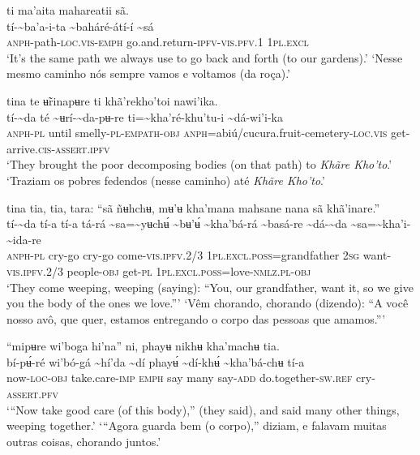 \documentclass[output=paper,
modfonts,nonflat
]{langsci/langscibook}
\begin{document}
\ea ti ma'aita mahareatii sã.  \\[.3em]
\gll tí-{\textasciitilde}ba'a-i-ta	{\textasciitilde}baháré-átí-í	{\textasciitilde}sá \\
     \textsc{anph}-path\textsc{-loc.vis-emph}	go.and.return-\textsc{ipfv-vis.pfv.}1	1\textsc{pl.excl}\\
\glt ‘It's the same path we always use to go back and forth (to our gardens).’
\glt ‘Nesse mesmo caminho nós sempre vamos e voltamos (da roça).’
\z 

\ea tina te ʉ̃rinapʉre ti khã'rekho'toi nawi'ika. \\[.3em]
\gll tí-{\textasciitilde}da	té	{\textasciitilde}ʉrí-{\textasciitilde}da-pʉ-re	ti={\textasciitilde}kha'ré-khu'tu-i	{\textasciitilde}dá-wi'i-ka \\
     \textsc{anph-pl}	until	smelly\textsc{-pl-empath-obj}	\textsc{anph}=abiú/cucura.fruit-cemetery\textsc{-loc.vis}	get-arrive\textsc{.cis-assert.ipfv}\\
\glt ‘They brought the poor decomposing bodies (on that path) to \textit{Khãre Kho’to}.’
\glt ‘Traziam os pobres fedendos (nesse caminho) até \textit{Khãre Kho’to}.’
\z 

\ea tina tia, tia, tara: “sã ñʉhchʉ, mʉ'ʉ kha'mana mahsane nana sã khã'inare.” \\[.3em]
\gll tí-{\textasciitilde}da	tí-a	tí-a	tá-rá {\textasciitilde}sa={\textasciitilde}yʉchʉ́	{\textasciitilde}bʉ'ʉ́	{\textasciitilde}kha'bá-rá	{\textasciitilde}basá-re	{\textasciitilde}dá-{\textasciitilde}da	{\textasciitilde}sa={\textasciitilde}kha'i-{\textasciitilde}ida-re\\
     \textsc{anph-pl}	cry-go	cry-go	come-\textsc{vis.ipfv.}2/3 1\textsc{pl.excl.poss}=grandfather	2\textsc{sg}	want-\textsc{vis.ipfv.}2/3	people\textsc{-obj}	get\textsc{-pl}	1\textsc{pl.excl.poss}=love\textsc{-nmlz.pl-obj}\\
\glt ‘They come weeping, weeping (saying): “You, our grandfather, want it, so we give you the body of the ones we love.”’
\glt ‘Vêm chorando, chorando (dizendo): “A você nosso avô, que quer, estamos entregando o corpo das pessoas que amamos.”’
\z 

\ea “mipʉre wi'boga hi'na” ni, phayʉ nikhʉ kha'machʉ tia. \\[.3em]
\gll {\textasciitilde}bí-pʉ́-ré	wi'bó-gá	{\textasciitilde}hí'da	{\textasciitilde}dí	phayʉ́	{\textasciitilde}dí-khʉ́	{\textasciitilde}kha'bá-chʉ	tí-a \\
     now\textsc{-loc-obj}	take.care-\textsc{imp}	\textsc{emph}	say	many	say-\textsc{add}	do.together-\textsc{sw.ref}	cry-\textsc{assert.pfv}\\
\glt ‘“Now take good care (of this body),” (they said), and said many other things, weeping together.’
\glt ‘“Agora guarda bem (o corpo),” diziam, e falavam muitas outras coisas, chorando juntos.’
\z 
\end{document}
